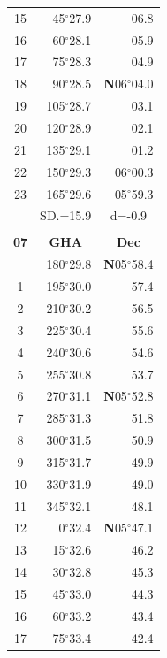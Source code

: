 \documentclass[10pt, a4paper]{report}
\begin{document}
\begin{scriptsize}
\begin{tabular*}{0.2\textwidth}[t]{@{\extracolsep{\fill}}|c|rr|}
15 & 45$^\circ$27.9 & \raisebox{0.24ex}{\boldmath$\cdot$~\boldmath$\cdot$~~}06.8\\
16 & 60$^\circ$28.1 & 05.9\\
17 & 75$^\circ$28.3 & 04.9\\[2Pt]
18 & 90$^\circ$28.5 & \textbf{N}06$^\circ$04.0\\
19 & 105$^\circ$28.7 & 03.1\\
20 & 120$^\circ$28.9 & 02.1\\
21 & 135$^\circ$29.1 & \raisebox{0.24ex}{\boldmath$\cdot$~\boldmath$\cdot$~~}01.2\\
22 & 150$^\circ$29.3 & 06$^\circ$00.3\\
23 & 165$^\circ$29.6 & 05$^\circ$59.3\\
\hline
\rule{0pt}{2.4ex} & \multicolumn{1}{c}{SD.=15.9} & \multicolumn{1}{c|}{d=-0.9}\\
\hline
\multicolumn{1}{c}{}\\[-0.5ex]\hline
\multicolumn{1}{|c|}{\rule{0pt}{2.6ex}\textbf{07}} & \multicolumn{1}{c}{\textbf{GHA}} & \multicolumn{1}{c|}{\textbf{Dec}}\\
\hline\rule{0pt}{2.6ex}\noindent
0 & 180$^\circ$29.8 & \textbf{N}05$^\circ$58.4\\
1 & 195$^\circ$30.0 & 57.4\\
2 & 210$^\circ$30.2 & 56.5\\
3 & 225$^\circ$30.4 & \raisebox{0.24ex}{\boldmath$\cdot$~\boldmath$\cdot$~~}55.6\\
4 & 240$^\circ$30.6 & 54.6\\
5 & 255$^\circ$30.8 & 53.7\\[2Pt]
6 & 270$^\circ$31.1 & \textbf{N}05$^\circ$52.8\\
7 & 285$^\circ$31.3 & 51.8\\
8 & 300$^\circ$31.5 & 50.9\\
9 & 315$^\circ$31.7 & \raisebox{0.24ex}{\boldmath$\cdot$~\boldmath$\cdot$~~}49.9\\
10 & 330$^\circ$31.9 & 49.0\\
11 & 345$^\circ$32.1 & 48.1\\[2Pt]
12 & 0$^\circ$32.4 & \textbf{N}05$^\circ$47.1\\
13 & 15$^\circ$32.6 & 46.2\\
14 & 30$^\circ$32.8 & 45.3\\
15 & 45$^\circ$33.0 & \raisebox{0.24ex}{\boldmath$\cdot$~\boldmath$\cdot$~~}44.3\\
16 & 60$^\circ$33.2 & 43.4\\
17 & 75$^\circ$33.4 & 42.4\\[2Pt]

\end{tabular*}
\end{scriptsize}
\end{document}
